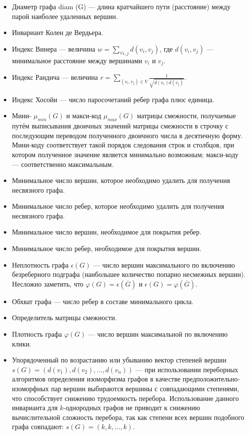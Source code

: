 \begin{itemize}
\item Диаметр графа  $\mathrm {diam}$ (G) — длина кратчайшего пути (расстояние) между парой наиболее удаленных вершин.
\item Инвариант Колен де Вердьера.
\item Индекс Винера — величина  $w=\sum _{{\forall i,j}}d(v_{i},v_{j})$, где  $d(v_{i},v_{j})$ — минимальное расстояние между вершинами  $v_{i}$ и  $v_{j}$.
\item Индекс Рандича — величина  $r=\sum _{{(v_{i},v_{j})\in V}}{\frac  {1}{{\sqrt  {d(v_{i})d(v_{j})}}}}$.
\item Индекс Хосойи — число паросочетаний ребер графа плюс единица.
\item Мини-  $\mu _{{min}}(G)$ и макси-код  $\mu _{{max}}(G)$ матрицы смежности, получаемые путём выписывания двоичных значений матрицы смежности в строчку с последующим переводом полученного двоичного числа в десятичную форму. Мини-коду соответствует такой порядок следования строк и столбцов, при котором полученное значение является минимально возможным; макси-коду — соответственно максимальным.
\item Минимальное число вершин, которое необходимо удалить для получения несвязного графа.
\item Минимальное число ребер, которое необходимо удалить для получения несвязного графа.
\item Минимальное число вершин, необходимое для покрытия ребер.
\item Минимальное число ребер, необходимое для покрытия вершин.
\item Неплотность графа  $\epsilon (G)$ — число вершин максимального по включению безреберного подграфа (наибольшее количество попарно несмежных вершин). Несложно заметить, что  $\varphi (G)=\epsilon (\overline {G})$ и  $\epsilon (G)=\varphi (\overline {G})$.
\item Обхват графа — число ребер в составе минимального цикла.
\item Определитель матрицы смежности.
\item Плотность графа  $\varphi (G)$ — число вершин максимальной по включению клики.
\item Упорядоченный по возрастанию или убыванию вектор степеней вершин  $s(G)=(d(v_{1}),d(v_{2}),\dots ,d(v_{n}))$ — при использовании переборных алгоритмов определения изоморфизма графов в качестве предположительно-изоморфных пар вершин выбираются вершины с совпадающими степенями, что способствует снижению трудоемкость перебора. Использование данного инварианта для $k$-однородных графов не приводит к снижению вычислительной сложность перебора, так как степени всех вершин подобного графа совпадают:  $s(G)=(k,k,\dots ,k)$.

\end{itemize}
